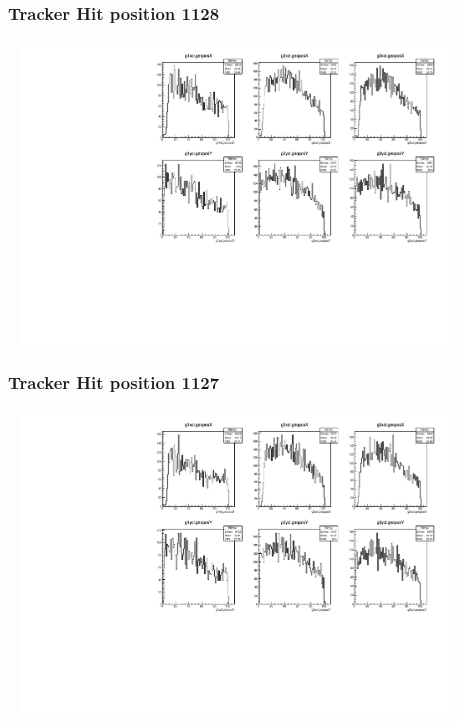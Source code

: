 \documentclass[slidestop,compress,mathserif]{beamer}
\begin{document}
\begin{frame}\frametitle{Tracker Hit position 1128}
	 \includegraphics[width=12cm,height=8cm]{Tracker_Hit_position_1128.pdf}
\end{frame}
\begin{frame}\frametitle{Tracker Hit position 1127}
	 \includegraphics[width=12cm,height=8cm]{Tracker_Hit_position_1127.pdf}
\end{frame}
\end{document}
